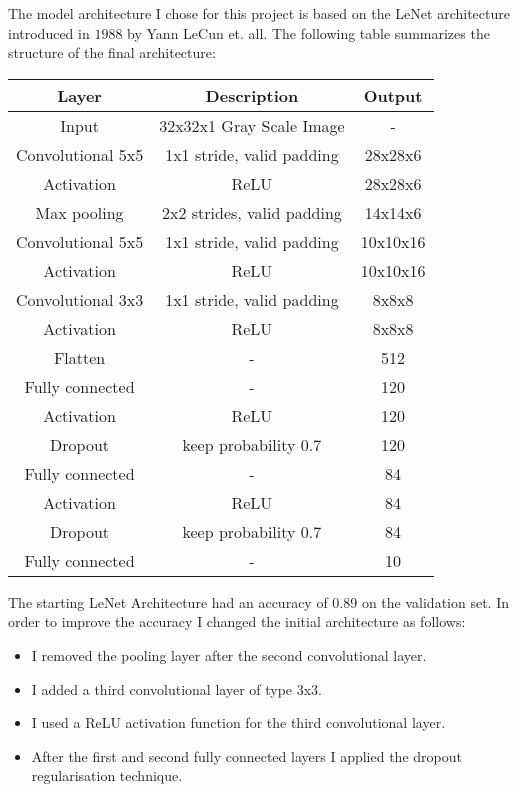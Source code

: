 \documentclass[11pt, a4paper]{amsart}
\begin{document}
 The model architecture I chose for this project is based on the LeNet architecture introduced in $1988$ by  Yann LeCun et. all. The following table summarizes the structure of the final architecture: 
 \begin{center}
\begin{tabular}{|c|c|c|}
\hline
Layer & Description & Output \\ \hline
Input & 32x32x1 Gray Scale Image & - \\ \hline
Convolutional 5x5 & 1x1 stride, valid padding & 28x28x6  \\ \hline
Activation & ReLU & 28x28x6 \\ \hline
Max pooling & 2x2 strides, valid padding & 14x14x6 \\ \hline 
Convolutional 5x5 & 1x1 stride, valid padding & 10x10x16  \\ \hline
Activation & ReLU & 10x10x16 \\ \hline
Convolutional 3x3 & 1x1 stride, valid padding & 8x8x8  \\ \hline
Activation & ReLU & 8x8x8 \\ \hline
Flatten & - & 512 \\ \hline
Fully connected & - & 120  \\ \hline
Activation & ReLU & 120 \\ \hline
Dropout & keep probability 0.7 & 120 \\ \hline
Fully connected & - & 84  \\ \hline
Activation & ReLU & 84\\ \hline
Dropout & keep probability 0.7 & 84 \\ \hline
Fully connected & - & 10  \\ \hline
\end{tabular}
\end{center}
\noindent
\newline
\noindent 
The starting LeNet Architecture had an accuracy of 0.89 on the validation set. In order to improve the accuracy I changed the initial architecture as follows:
\begin{itemize}
\item I removed the pooling layer after the second convolutional layer.
\item I added a third convolutional layer of type 3x3.
\item I used a ReLU activation function for the third convolutional layer. 
\item After the first and second fully connected layers I applied the dropout regularisation technique. 
\end{itemize}
\end{document}
